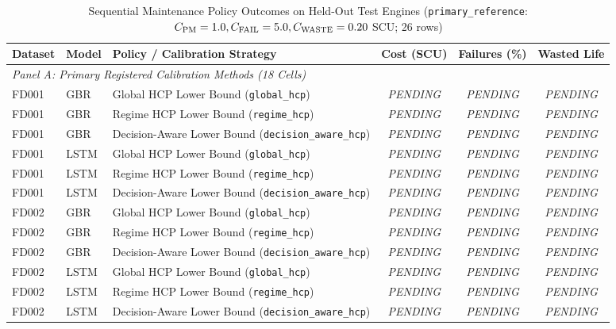 \begin{table}[htbp]
\centering
\small
\caption{Sequential Maintenance Policy Outcomes on Held-Out Test Engines (\texttt{primary\_reference}: $C_{\text{PM}}=1.0, C_{\text{FAIL}}=5.0, C_{\text{WASTE}}=0.20$ SCU; 26 rows)}
\label{tab:thesis_maintenance_outcomes}
\begin{tabular}{lllccc}
\toprule
\textbf{Dataset} & \textbf{Model} & \textbf{Policy / Calibration Strategy} & \textbf{Cost (SCU)} & \textbf{Failures (\%)} & \textbf{Wasted Life} \\
\midrule
\multicolumn{6}{l}{\textit{Panel A: Primary Registered Calibration Methods (18 Cells)}} \\
\midrule
FD001 & GBR  & Global HCP Lower Bound (\texttt{global\_hcp})             & \textit{PENDING} & \textit{PENDING} & \textit{PENDING} \\
FD001 & GBR  & Regime HCP Lower Bound (\texttt{regime\_hcp})             & \textit{PENDING} & \textit{PENDING} & \textit{PENDING} \\
FD001 & GBR  & Decision-Aware Lower Bound (\texttt{decision\_aware\_hcp})& \textit{PENDING} & \textit{PENDING} & \textit{PENDING} \\
FD001 & LSTM & Global HCP Lower Bound (\texttt{global\_hcp})             & \textit{PENDING} & \textit{PENDING} & \textit{PENDING} \\
FD001 & LSTM & Regime HCP Lower Bound (\texttt{regime\_hcp})             & \textit{PENDING} & \textit{PENDING} & \textit{PENDING} \\
FD001 & LSTM & Decision-Aware Lower Bound (\texttt{decision\_aware\_hcp})& \textit{PENDING} & \textit{PENDING} & \textit{PENDING} \\
FD002 & GBR  & Global HCP Lower Bound (\texttt{global\_hcp})             & \textit{PENDING} & \textit{PENDING} & \textit{PENDING} \\
FD002 & GBR  & Regime HCP Lower Bound (\texttt{regime\_hcp})             & \textit{PENDING} & \textit{PENDING} & \textit{PENDING} \\
FD002 & GBR  & Decision-Aware Lower Bound (\texttt{decision\_aware\_hcp})& \textit{PENDING} & \textit{PENDING} & \textit{PENDING} \\
FD002 & LSTM & Global HCP Lower Bound (\texttt{global\_hcp})             & \textit{PENDING} & \textit{PENDING} & \textit{PENDING} \\
FD002 & LSTM & Regime HCP Lower Bound (\texttt{regime\_hcp})             & \textit{PENDING} & \textit{PENDING} & \textit{PENDING} \\
FD002 & LSTM & Decision-Aware Lower Bound (\texttt{decision\_aware\_hcp})& \textit{PENDING} & \textit{PENDING} & \textit{PENDING} \\

\end{tabular}
\end{table}
